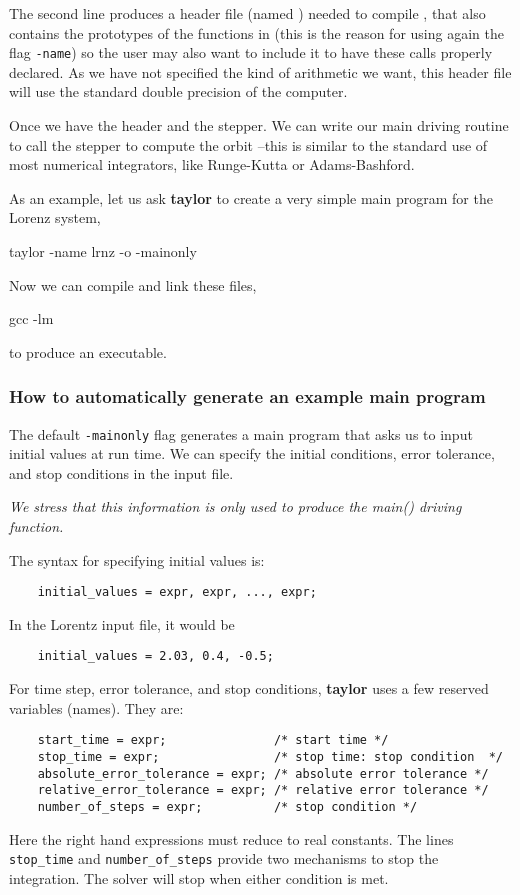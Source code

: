 \documentclass[10pt]{article}
\theoremstyle{remark}
\newcommand{\taylorname}{{\bf taylor}}
\newcommand{\inputfile}{}
\newcommand{\mainfile}{}
\newcommand{\odecfile}{}
\newcommand{\odehfile}{}
\begin{document}
The second line produces a header file (named \odehfile{}) needed to
compile \odecfile{}, that also contains the prototypes of the
functions in \odecfile{} (this is the reason for using again the flag
{\tt -name}) so the user may also want to include it to have these
calls properly declared. As we have not specified the kind of
arithmetic we want, this header file will use the standard double
precision of the computer.

\smallskip

Once we have the header and the stepper. We can write our main driving
routine to call the stepper to compute the orbit --this is similar to
the standard use of most numerical integrators, like Runge-Kutta or
Adams-Bashford.

\smallskip

As an example, let us ask \taylorname{} to create a very simple main
program for the Lorenz system,
\begin{command}
   taylor -name lrnz -o \mainfile{} -mainonly \inputfile{}
\end{command}
Now we can compile and link these files,
\begin{command}
   gcc  \mainfile{} \odecfile{} -lm
\end{command}
to produce an executable. 


\subsubsection*{How to automatically generate an example main program}
The default {\tt -mainonly} flag generates a main program
that asks us to input initial values at run time. We can
specify the initial conditions, error tolerance, and stop conditions
in the input file.

\begin{center}
{\em We stress that this information is only used to produce the
  main() driving function.}
\end{center}

The syntax for specifying initial values is:
\begin{verbatim}
    initial_values = expr, expr, ..., expr;
\end{verbatim}
In the Lorentz input file, it would be
\begin{verbatim}
    initial_values = 2.03, 0.4, -0.5;
\end{verbatim}

For time step, error tolerance, and stop conditions, \taylorname{}
uses a few reserved variables (names).  They are:
\begin{verbatim}
    start_time = expr;               /* start time */
    stop_time = expr;                /* stop time: stop condition  */
    absolute_error_tolerance = expr; /* absolute error tolerance */
    relative_error_tolerance = expr; /* relative error tolerance */
    number_of_steps = expr;          /* stop condition */
\end{verbatim}
Here the right hand expressions must reduce to real constants.  The
lines \verb+stop_time+ and \verb+number_of_steps+ provide two
mechanisms to stop the integration. The solver will stop
when either condition is met.
\end{document}
